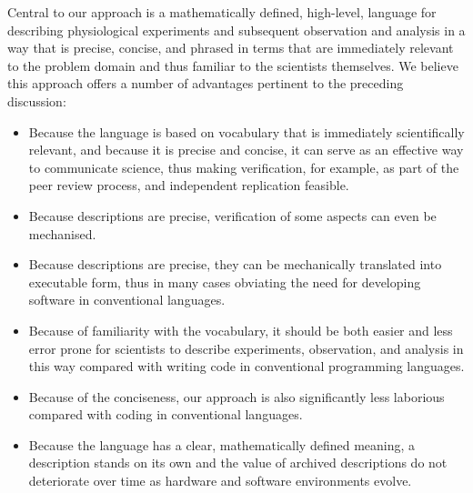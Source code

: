 Central to our approach is a mathematically defined, high-level, language for
describing physiological experiments and subsequent observation and analysis
in a way that is precise, concise, and phrased in terms that are immediately
relevant to the problem domain and thus familiar to the scientists themselves.
We believe this approach offers a number of advantages pertinent to the
preceding discussion:
\begin{itemize}
\item
    Because the language is based on vocabulary that is immediately
    scientifically relevant, and because it is precise and concise, it can
    serve as an effective way to communicate science, thus making verification,
    for example, as part of the peer review process, and independent
    replication feasible.
\item
    Because descriptions are precise, verification of some aspects
    can even be mechanised.
\item
    Because descriptions are precise, they can be mechanically translated
    into executable form, thus in many cases obviating the need for
    developing software in conventional languages.
\item
    Because of familiarity with the vocabulary, it should be both
    easier and less error prone for scientists to describe experiments,
    observation, and analysis in this way compared with writing code in
    conventional programming languages.    
\item
    Because of the conciseness, our approach is also significantly
    less laborious compared with coding in conventional languages.
\item
    Because the language has a clear, mathematically defined meaning,
    a description stands on its own and the value of archived descriptions
    do not deteriorate over time as hardware and software environments
    evolve.
\end{itemize}

